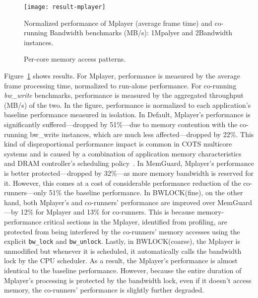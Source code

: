 \documentclass[times, 10pt,onecolumn]{article}
\begin{document}
\begin{figure}
\centering
\texttt{[image: result-mplayer]}
\caption{Normalized performance of Mplayer (average frame time) and
co-running Bandwidth benchmarks (MB/s): 1Mpalyer and 2Bandwidth instances.}
\label{fig:result-mplayer}
\end{figure}

\begin{figure*}
\centering
\centering
{}
\caption{Per-core memory access patterns. }
\label{fig:percore-view}
\end{figure*}


Figure~\ref{fig:result-mplayer} shows results. For Mplayer,
performance is measured by the average frame processing time,
normalized to run-alone performance. For co-running \emph{bw\_write}
benchmarks, performance is measured by the aggregated throughput
(MB/s) of the two. In the figure, performance is normalized to each
application's baseline performance measured in isolation. In Default,
Mplayer's performance is significantly suffered---dropped by 51\%---due to
memory contention with the co-running bw\_write instances, which are
much less affected---dropped by 22\%. This kind of disproportional
performance impact is common in COTS multicore systems and is caused
by a combination of application memory characteristics and DRAM
controller's scheduling
policy~\cite{moscibroda2007memory,kim2010thread}.
In MemGuard, Mplayer's performance is better protected---dropped by
32\%---as more memory bandwidth is reserved for it. However, this
comes at a cost of considerable performance reduction of the
co-runners---only 51\% the baseline performance. In BWLOCK(fine), on
the other hand, both Mplayer's and co-runners' performance are
improved over MemGuard---by 12\% for Mplayer and 13\% for
co-runners. This is because memory-performance critical sections in
the Mplayer, identified from profiling, are protected from being
interfered by the co-runners' memory accesses using the explicit
\texttt{bw\_lock} and \texttt{bw\_unlock}. Lastly, in BWLOCK(coarse),
the Mplayer is unmodified but whenever it is scheduled, it
automatically calls the bandwidth lock by the CPU scheduler. As a
result, the Mplayer's performance is almost identical to the baseline
performance. However, because the entire duration of Mplayer's
processing is protected by the bandwidth lock, even if it doesn't
access memory, the co-runners' performance is slightly further
degraded.
\end{document}
